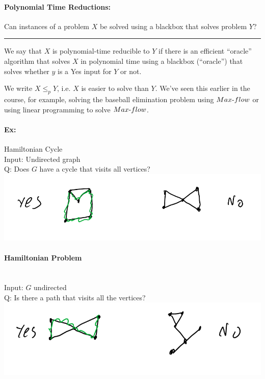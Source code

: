\documentclass[12 pt]{article}
\begin{document}
          \paragraph{Polynomial Time Reductions:} Can instances of a
          problem $X$ be solved using a blackbox that solves problem
          $Y$?
          \\ \noindent \rule{\textwidth}{0.5pt}
          We say that $X$ is polynomial-time reducible to $Y$ if there
          is an efficient ``oracle'' algorithm that solves
          $X$ in polynomial time using a blackbox (``oracle'') that
          solves whether $y$ is a Yes input for $Y$ or not.

          We write $X \leq_p Y$, i.e. $X$ is easier to solve than
          $Y$. We've seen this earlier in the course, for example,
          solving the baseball elimination problem using
          $Max\hbox{-}flow$ or using linear programming to solve
          $Max\hbox{-}flow$.
          \paragraph{Ex:} Hamiltonian Cycle
          \\ Input: Undirected graph
          \\ Q: Does $G$ have a cycle that visits all vertices?
          \\ \includegraphics[width=.9\textwidth]{i120.pdf}
          \paragraph{Hamiltonian Problem}~
          \\ Input: $G$ undirected
          \\ Q: Is there a path that visits all the vertices?
          \\ \includegraphics[width=.9\textwidth]{i121.pdf}
\end{document}
